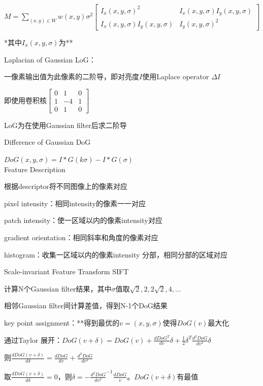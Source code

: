 \documentclass[UTF8]{ctexart}
\begin{document}
  \quad $M = \sum_{(x, y) \in W}w(x, y)\sigma^2
    \begin{bmatrix}
      I_x(x, y, \sigma)^2 & I_x(x, y, \sigma)I_y(x, y, \sigma) \\
      I_x(x, y, \sigma)I_y(x, y, \sigma) & I_y(x, y, \sigma)^2
      \end{bmatrix}$

  \quad \quad **其中$I_x(x, y, \sigma)$为**

  Laplacian of Gaussian LoG：

  \quad 一像素输出值为此像素的二阶导，即对亮度$I$使用Laplace operator $\Delta I$

  \quad \quad 即使用卷积核$
    \begin{bmatrix}
      0 & 1 & 0 \\
      1 & -4 & 1 \\
      0 & 1 & 0
      \end{bmatrix}$

  \quad LoG为在使用Gaussian filter后求二阶导

  Difference of Gaussian DoG
  
  \quad $DoG(x, y, \sigma) = I * G(k\sigma) - I * G(\sigma)$\\
Feature Description

  根据descriptor将不同图像上的像素对应

  \quad pixel intensity：相同intensity的像素一一对应

  \quad patch intensity：使一区域以内的像素intensity对应

  \quad gradient orientation：相同斜率和角度的像素对应

  \quad histogram：收集一区域以内的像素intensity 分部，相同分部的区域对应

  Scale-invariant Feature Transform SIFT

  \quad 计算N个Gaussian filter结果，其中$\sigma$值取$\sqrt{2}, 2, 2\sqrt{2}, 4,...$

  \quad 相邻Gaussian filter间计算差值，得到N-1个DoG结果

  \quad key point assignment：**得到最优的$v = (x, y, \sigma)$使得$DoG(v)$最大化

  \quad \quad 通过Taylor 展开：$DoG(v + \delta) = DoG(v) + \frac{dDoG^T}{dv}\delta + \frac{1}{2}\delta^T\frac{d^2DoG}{dv^2}\delta$

  \quad \quad \quad 则$\frac{dDoG(v + \delta)}{d\delta} = \frac{dDoG}{dv} + \frac{d^2DoG}{dv^2}$

  \quad \quad \quad 取$\frac{dDoG(v + \delta)}{d\delta} = 0$，则$\delta = -\frac{d^2DoG}{dv^2}^{-1}\frac{dDoG}{v}$。$DoG(v + \delta)$有最值
\end{document}
